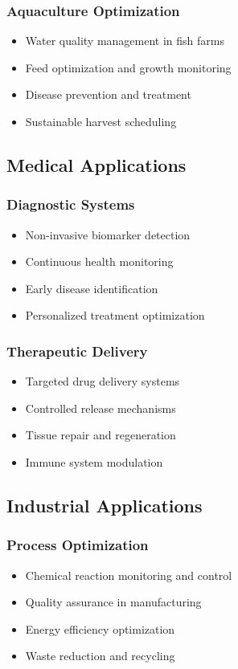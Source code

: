 \documentclass[11pt,a4paper]{article}
\begin{document}
\subsubsection{Aquaculture Optimization}
\begin{itemize}
    \item Water quality management in fish farms
    \item Feed optimization and growth monitoring
    \item Disease prevention and treatment
    \item Sustainable harvest scheduling
\end{itemize}

\subsection{Medical Applications}

\subsubsection{Diagnostic Systems}
\begin{itemize}
    \item Non-invasive biomarker detection
    \item Continuous health monitoring
    \item Early disease identification
    \item Personalized treatment optimization
\end{itemize}

\subsubsection{Therapeutic Delivery}
\begin{itemize}
    \item Targeted drug delivery systems
    \item Controlled release mechanisms
    \item Tissue repair and regeneration
    \item Immune system modulation
\end{itemize}

\subsection{Industrial Applications}

\subsubsection{Process Optimization}
\begin{itemize}
    \item Chemical reaction monitoring and control
    \item Quality assurance in manufacturing
    \item Energy efficiency optimization
    \item Waste reduction and recycling
\end{itemize}
\end{document}
